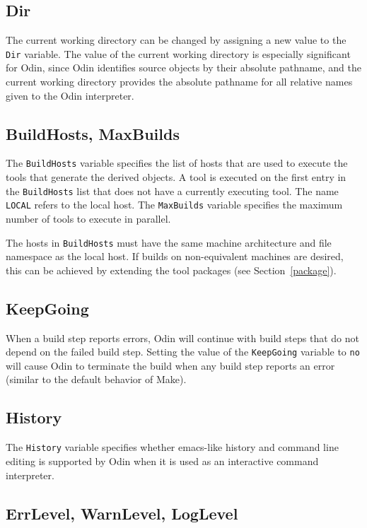 \documentclass[hidelinks]{report}
\newcommand{\ex}{\tt}   %
\begin{document}
\subsection{Dir}

The current working directory can be changed by assigning a new value
to the {\ex Dir} variable.
The value of the current working directory is especially significant for Odin,
since Odin identifies source objects by their absolute pathname,
and the current working directory provides the absolute pathname
for all relative names given to the Odin interpreter.

\subsection{BuildHosts, MaxBuilds}

The {\ex BuildHosts} variable specifies the list of hosts that are used to
execute the tools that generate the derived objects.
A tool is executed on the first entry in the {\ex BuildHosts}
list that does not have a currently executing tool.
The name {\ex LOCAL} refers to the local host.
The {\ex MaxBuilds} variable specifies the maximum number of tools
to execute in parallel.

The hosts in {\ex BuildHosts} must have
the same machine architecture and file namespace as the local host.
If builds on non-equivalent machines are desired,
this can be achieved by extending the tool packages
(see Section~\ref{package}).

\subsection{KeepGoing}
\label{keepgoing}

When a build step reports errors, Odin will continue with build
steps that do not depend on the failed build step.
Setting the value of the {\ex KeepGoing} variable to {\ex no}
will cause Odin to terminate the build when any build step
reports an error (similar to the default behavior of Make).

\subsection{History}
\label{history}

The {\ex History} variable specifies whether emacs-like 
history and command line editing is supported by Odin
when it is used as an interactive command interpreter.

\subsection{ErrLevel, WarnLevel, LogLevel}
\label{errlevel}
\end{document}
